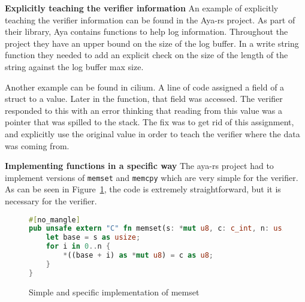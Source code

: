 
\noindent\textbf{Explicitly teaching the verifier information}
An example of explicitly teaching the verifier information can be found in the Aya-rs project.
As part of their library, Aya contains functions to help log information.
Throughout the project they have an upper bound on the size of the log buffer.
In a write string function they needed to add an explicit check on the size of the length of the string against the log buffer max size.

Another example can be found in cilium.
A line of code assigned a field of a struct to a value.
Later in the function, that field was accessed.
The verifier responded to this with an error thinking that reading from this value was a pointer that was spilled to the stack.
The fix was to get rid of this assignment, and explicitly use the original value in order to teach the verifier where the data was coming from.

\noindent\textbf{Implementing functions in a specific way}
The aya-rs project had to implement versions of \texttt{memset} and \texttt{memcpy} which are very simple for the verifier.
As can be seen in Figure~\ref{fig:aya-memset}, the code is extremely straightforward, but it is necessary for the verifier.

\begin{figure}
    \begin{lstlisting}[language=rust]
#[no_mangle]
pub unsafe extern "C" fn memset(s: *mut u8, c: c_int, n: usize) {
    let base = s as usize;
    for i in 0..n {
        *((base + i) as *mut u8) = c as u8;
    }
}
    \end{lstlisting}
    \caption{Simple and specific implementation of memset}
    \label{fig:aya-memset}
\end{figure}

